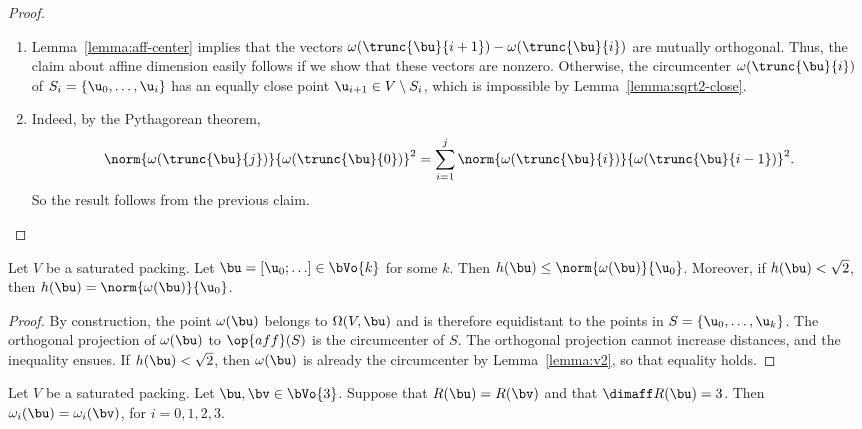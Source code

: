 \begin{cnl}
\begin{proof}
\begin{enumerate}
\item{}
%
%
  Lemma~\ref{lemma:aff-center} implies that the vectors
  ${\omega(\trunc{\bu}{i+1})}-{\omega(\trunc{\bu}{i})}$ are mutually
  orthogonal.  Thus, the claim about affine dimension easily follows
  if we show that these vectors are nonzero.
Otherwise, the
circumcenter $\omega(\trunc{\bu}{i})$ of $S_i=\setenumdots{\u}{0}{i}$
has an equally close point $ \u_{i+1}\in V\setminus S_i$, which is
impossible by Lemma~\ref{lemma:sqrt2-close}.

\item{}  
Indeed, by the Pythagorean theorem,
\begin{equation} 
\norm{\omega(\trunc{\bu}{j})}{\omega(\trunc{\bu}{0})}^2 =
\sumupto{i}{1}{j}{\norm{\omega(\trunc{\bu}{i})}{\omega(\trunc{\bu}{i-1})}^2}.
\end{equation}
So the result follows from the
previous claim.
\end{enumerate}
\end{proof}


\begin{lemma}
\label{lemma:h-omega}
%
Let $V$ be a saturated packing.  Let $\bu =[\u_0;\ldots]\in \bVo{k}$
for some $k$.  Then $h(\bu)\le \norm{\omega(\bu)}{\u_0}$.  Moreover,
if $h(\bu)<\sqrt2$, then $h(\bu)=\norm{\omega(\bu)}{\u_0}$.
\end{lemma}


\begin{proof} By construction, the point $\omega(\bu)$ belongs to
  $\Omega(V,\bu)$ and is therefore equidistant to the points in
  $S=\setenumdots{\u}{0}{k}$.  The orthogonal projection of
  $\omega(\bu)$ to $\op{aff}(S)$ is the circumcenter of $S$.  The
  orthogonal projection cannot increase distances, and the inequality
  ensues.  If $h(\bu)<\sqrt2$, then $\omega(\bu)$ is already the
  circumcenter by Lemma~\ref{lemma:v2}, so that equality holds.
\end{proof}


\begin{lemma}
\label{lemma:omega-uv}  %
%
Let $V$ be a saturated packing.  Let $\bu,\bv\in \bVo{3}$.  Suppose
that $R(\bu)=R(\bv)$ and that $\dimaff R(\bu)=3$.  Then
$\omega_i(\bu)=\omega_i(\bv)$, for $i=0,1,2,3$.
\end{lemma}



\end{cnl}
